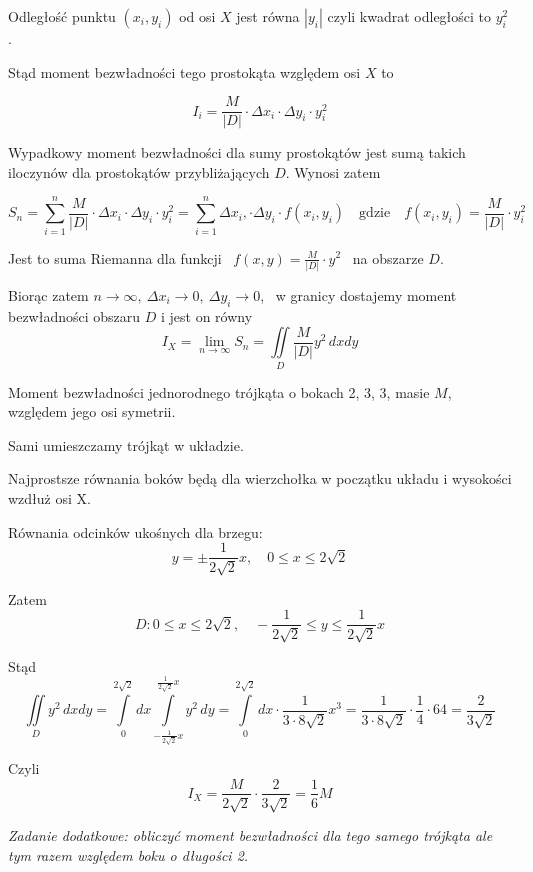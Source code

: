 Odległość punktu $(x_i, y_i)$ od osi $X$ jest równa $|y_i|$ czyli kwadrat odległości to $y_i^2$.

Stąd moment bezwładności tego prostokąta względem osi $X$ to 

\[ I_i = \frac{M}{|D|} \cdot \Delta x_i \cdot \Delta y_i \cdot y_i^2 \]

Wypadkowy moment bezwładności dla sumy prostokątów jest sumą takich iloczynów dla prostokątów przybliżających $D$. Wynosi zatem

\[ S_n = \sum\limits_{i = 1}^{n} \frac{M}{|D|} \cdot \Delta x_i \cdot \Delta y_i \cdot y_i^2 = \sum\limits_{i = 1}^{n} \Delta x_i, \cdot \Delta y_i \cdot f(x_i, y_i)
\quad \text{gdzie} \quad f(x_i, y_i) = \frac{M}{|D|} \cdot y_i^2 \]

Jest to suma Riemanna dla funkcji \ $ f(x,y) = \frac{M}{|D|} \cdot y^2 $ \ na obszarze $D$.

Biorąc zatem $ n \to \infty, \ \Delta x_i \to 0, \ \Delta y_i \to 0 $, \ w granicy dostajemy moment bezwładności obszaru $D$ i jest on równy 
\[ I_X = \lim_{n \to \infty} S_n =\iint\limits_D \frac{M}{|D|} y^2 \, dxdy \]

\begin{przyklad}
    Moment bezwładności jednorodnego trójkąta o bokach 2, 3, 3, masie $M$, względem jego osi symetrii. \bigskip

    Sami umieszczamy trójkąt w układzie.

    Najprostsze równania boków będą dla wierzchołka w początku układu i wysokości wzdłuż osi X.

    Równania odcinków ukośnych dla brzegu:
    \[ y = \pm \frac{1}{2\sqrt2}x, \quad 0 \leq x \leq 2\sqrt2 \]

    Zatem
    \[ D: 0 \leq x \leq 2\sqrt2, \quad -\frac{1}{2\sqrt2} \leq y \leq \frac{1}{2\sqrt2}x \]

    Stąd
    \[ \iint\limits_D y^2 \, dxdy = \int\limits_{0}^{2\sqrt2} dx \int\limits_{-\frac{1}{2\sqrt2}x}^{\frac{1}{2\sqrt2}x} y^2 \, dy = \int\limits_{0}^{2\sqrt2} dx \cdot \frac{1}{3 \cdot 8\sqrt2} x^3
    = \frac{1}{3 \cdot 8\sqrt2} \cdot \frac{1}{4} \cdot 64 = \frac{2}{3\sqrt2} \]

    Czyli
    \[ I_X = \frac{M}{2\sqrt2} \cdot \frac{2}{3\sqrt2} = \frac{1}{6}M \]

    \it{Zadanie dodatkowe: obliczyć moment bezwładności dla tego samego trójkąta ale tym razem względem boku o długości 2.}
\end{przyklad}